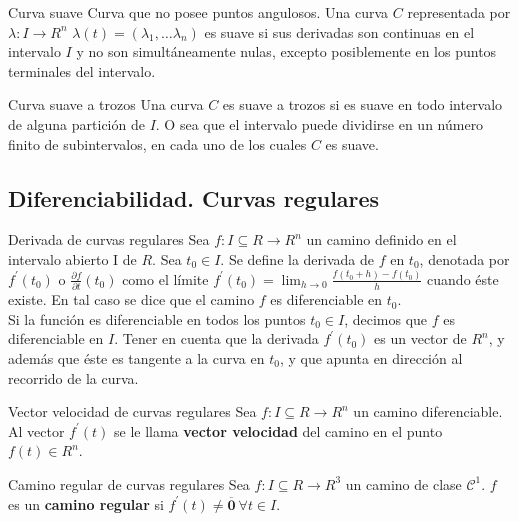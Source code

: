 \documentclass[a4paper, twoside]{article}
\numberwithin{equation}{section}
\numberwithin{figure}{section}
\numberwithin{table}{section}
\newcommand{\vect}[1]{\overline{\textbf{#1}}}
\begin{document}
\begin{definicion*}{Curva suave}
	Curva que no posee puntos angulosos. Una curva $C$ representada por $\lambda: I \rightarrow R^{n}$ $\lambda(t) = (\lambda_1,\ldots\lambda_n)$ es suave si sus derivadas son continuas en el intervalo $I$ y no son simultáneamente nulas, excepto posiblemente en los puntos terminales del intervalo.
\end{definicion*}

\begin{definicion*}{Curva suave a trozos}
	Una curva $C$ es suave a trozos si es suave en todo intervalo de alguna partición de $I$. O sea que el intervalo puede dividirse en un número finito de subintervalos, en cada uno de los cuales $C$ es suave.
\end{definicion*}

\subsection{Diferenciabilidad. Curvas regulares}
\begin{definicion*}{Derivada de curvas regulares}
	Sea $f:I\subseteq R \to R^n$ un camino definido en el intervalo abierto I de $R$. Sea $t_0 \in I$. Se define la derivada de $f$ en $t_0$, denotada por $f^\prime(t_0)$ o $\frac{\partial f}{\partial t}(t_0)$ como el límite $f^\prime (t_0)=\lim_{h \to 0}\frac{f(t_0+h)-f(t_0)}{h}$ cuando éste existe. En tal caso se dice que el camino $f$ es diferenciable en $t_0$.\\
	
	Si la función es diferenciable en todos los puntos $t_0 \in I$, decimos que $f$ es diferenciable en $I$. Tener en cuenta que la derivada $f^\prime (t_0)$ es un vector de $R^n$, y además que éste es tangente a la curva en $t_0$, y que apunta en dirección al recorrido de la curva.
\end{definicion*}

\begin{definicion*}{Vector velocidad de curvas regulares}
	Sea $f: I \subseteq R \to R^n$ un camino diferenciable. Al vector $f^\prime(t)$ se le llama \textbf{vector velocidad} del camino en el punto $f(t) \in R^n$.
\end{definicion*}

\begin{definicion*}{Camino regular de curvas regulares}
	Sea $f: I \subseteq R \to R^3$ un camino de clase $\mathcal{C}^{1}$. $f$ es un \textbf{camino regular} si $f^\prime (t) \ne\vect{0}\:\forall t \in I.$
\end{definicion*}
\end{document}
